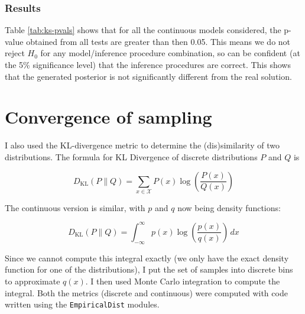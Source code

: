 \subsubsection{Results}

Table \ref{tab:ks-pvals} shows that for all the continuous models considered, the p-value obtained from all tests are greater than then 0.05. This means we do not reject $H_0$ for any model/inference procedure combination, so can be confident (at the 5\% significance level) that the inference procedures are correct. This shows that the generated posterior is not significantly different from the real solution.

\begin{table}[!ht]
	\centering
	\caption{p-values of K-S test on different models using different inference procedures}
	\label{tab:ks-pvals}
\end{table}


\section{Convergence of sampling}
I also used the KL-divergence metric to determine the (dis)similarity of two distributions. The formula for KL Divergence of discrete distributions $P$ and $Q$ is

$${D_{\text{KL}}(P\parallel Q)=\sum _{x\in {\mathcal {X}}}P(x)\log \left({\frac {P(x)}{Q(x)}}\right)}$$

The continuous version is similar, with $p$ and $q$ now being density functions:

$${D_\text{KL}}(P\parallel Q)=\int _{-\infty }^{\infty }p(x)\log \left({\frac {p(x)}{q(x)}}\right)\,dx$$

Since we cannot compute this integral exactly (we only have the exact density function for one of the distributions), I put the set of samples into discrete bins to approximate $q(x)$. I then used Monte Carlo integration to compute the integral. Both the metrics (discrete and continuous) were computed with code written using the \texttt{EmpiricalDist} modules. 

